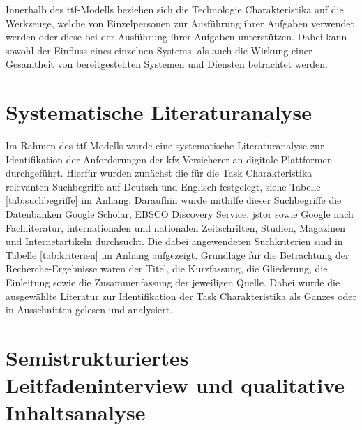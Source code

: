 Innerhalb des \acs{ttf}-Modells beziehen sich die Technologie Charakteristika auf die Werkzeuge, welche von Einzelpersonen zur Ausführung ihrer Aufgaben verwendet werden oder diese bei der Ausführung ihrer Aufgaben unterstützen.\autocite[Vgl.][S. 399]{SPIES2020} Dabei kann sowohl der Einfluss eines einzelnen Systems, als auch die Wirkung einer Gesamtheit von bereitgestellten Systemen und Diensten betrachtet werden. \autocite[Vgl.][S. 216]{GOODHUE1995}





\section{Systematische Literaturanalyse}


Im Rahmen des \acs{ttf}-Modells wurde eine systematische Literaturanalyse zur Identifikation der Anforderungen der \ac{kfz}-Versicherer an digitale Plattformen durchgeführt. Hierfür wurden zunächst die für die Task Charakteristika relevanten Suchbegriffe auf Deutsch und Englisch festgelegt, siehe Tabelle \ref{tab:suchbegriffe} im Anhang. Daraufhin wurde mithilfe dieser Suchbegriffe die Datenbanken Google Scholar, EBSCO Discovery Service, \ac{jstor} sowie Google nach Fachliteratur, internationalen und nationalen Zeitschriften, Studien, Magazinen und Internetartikeln durchsucht. Die dabei angewendeten Suchkriterien sind in Tabelle \ref{tab:kriterien} im Anhang aufgezeigt. Grundlage für die Betrachtung der Recherche-Ergebnisse waren der Titel, die Kurzfassung, die Gliederung, die Einleitung sowie die Zusammenfassung der jeweiligen Quelle. Dabei wurde die ausgewählte Literatur zur Identifikation der Task Charakteristika als Ganzes oder in Ausschnitten gelesen und analysiert. \autocite[Vgl.][]{SOLIS2021}





\section{Semistrukturiertes Leitfadeninterview und qualitative Inhaltsanalyse}

